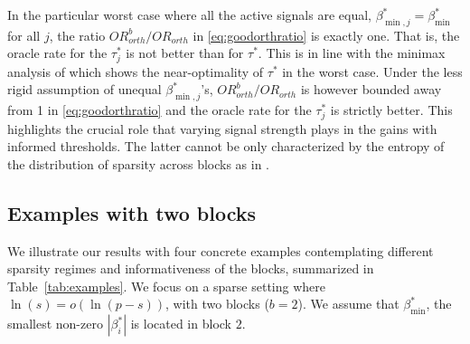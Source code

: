 \documentclass[bj,authoryear]{imsart}
\theoremstyle{plain}
\begin{document}
In the particular worst case where all the active signals are equal, $\beta^*_{\min,j}=\beta^*_{\min}$ for all $j$, the ratio 
${OR}^b_{orth}/{OR}_{orth}$ in \eqref{eq:goodorthratio} is exactly one. That is, the oracle rate for the $\tau_j^*$ is not better than for $\tau^*$. This is in line with the minimax analysis of \cite{butucea2018} which shows the near-optimality of $\tau^*$ in the worst case. Under the less rigid assumption of unequal $\beta^*_{\min,j}$'s, ${OR}^b_{orth}/{OR}_{orth}$ is however bounded away from 1 in \eqref{eq:goodorthratio} and the oracle rate for the $\tau_j^*$ is strictly better. This highlights the crucial role that varying signal strength plays in the gains with informed thresholds. The latter cannot be only characterized by the entropy of the distribution of sparsity across blocks as in \cite{scarlett2012compressed}. 

\subsection{Examples with two blocks}\label{sec:examples}

We illustrate our results with four concrete examples contemplating different sparsity regimes and informativeness of the blocks, summarized in Table~\ref{tab:examples}. We focus on a sparse setting where $\ln(s)=o(\ln(p-s))$, with two blocks ($b=2$). We assume that $\beta_{\min}^*$, the smallest non-zero $|\beta_i^*|$ is located in block $2$. 
\end{document}
